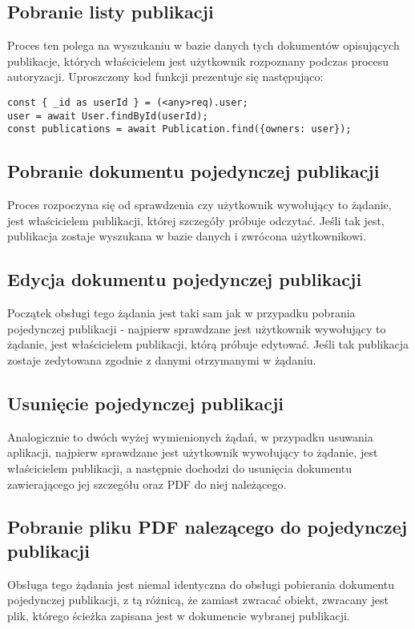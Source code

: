 \documentclass[a4paper,12pt,twoside,openany]{report}
\begin{document}
\subsection{Pobranie listy publikacji}
Proces ten polega na wyszukaniu w bazie danych tych dokumentów opisujących publikacje, których właścicielem jest użytkownik rozpoznany podczas procesu autoryzacji. Uproszczony kod funkcji prezentuje się następująco:
\begin{verbatim}
const { _id as userId } = (<any>req).user;
user = await User.findById(userId);
const publications = await Publication.find({owners: user});	
\end{verbatim}

\subsection{Pobranie dokumentu pojedynczej publikacji}
Proces rozpoczyna się od sprawdzenia czy użytkownik wywołujący to żądanie, jest właścicielem publikacji, której szczegóły próbuje odczytać. Jeśli tak jest, publikacja zostaje wyszukana w bazie danych i zwrócona użytkownikowi.

\subsection{Edycja dokumentu pojedynczej publikacji}
Początek obsługi tego żądania jest taki sam jak w przypadku pobrania pojedynczej publikacji - najpierw sprawdzane jest użytkownik wywołujący to żądanie, jest właścicielem publikacji, którą próbuje edytować. Jeśli tak publikacja zostaje zedytowana zgodnie z danymi otrzymanymi w żądaniu.

\subsection{Usunięcie pojedynczej publikacji}
Analogicznie to dwóch wyżej wymienionych żądań, w przypadku usuwania aplikacji, najpierw sprawdzane jest użytkownik wywołujący to żądanie, jest właścicielem publikacji, a następnie dochodzi do usunięcia dokumentu zawierającego jej szczegółu oraz PDF do niej należącego.

\subsection{Pobranie pliku PDF nalezącego do pojedynczej publikacji}
Obsługa tego żądania jest niemal identyczna do obsługi pobierania dokumentu pojedynczej publikacji, z tą różnicą, że zamiast zwracać obiekt, zwracany jest plik, którego ścieżka zapisana jest w dokumencie wybranej publikacji.
\end{document}
